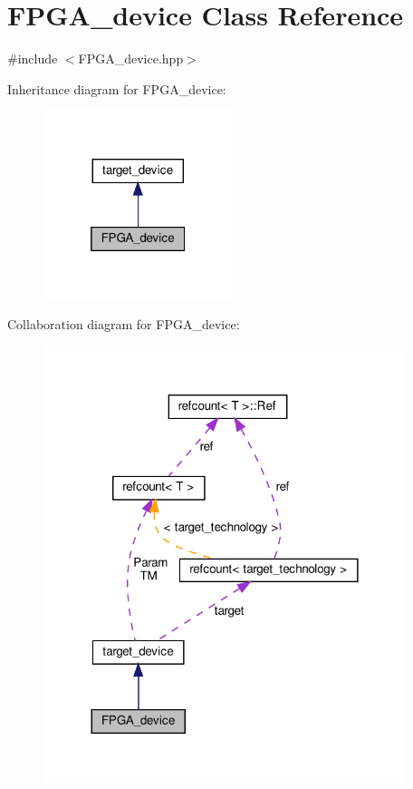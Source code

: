 \hypertarget{classFPGA__device}{}\section{F\+P\+G\+A\+\_\+device Class Reference}
\label{classFPGA__device}


{\ttfamily \#include $<$F\+P\+G\+A\+\_\+device.\+hpp$>$}



Inheritance diagram for F\+P\+G\+A\+\_\+device\+:
\nopagebreak
\begin{figure}[H]
\begin{center}
\leavevmode
\includegraphics[width=157pt]{d5/d11/classFPGA__device__inherit__graph}
\end{center}
\end{figure}


Collaboration diagram for F\+P\+G\+A\+\_\+device\+:
\nopagebreak
\begin{figure}[H]
\begin{center}
\leavevmode
\includegraphics[width=300pt]{dd/db0/classFPGA__device__coll__graph}
\end{center}
\end{figure}
